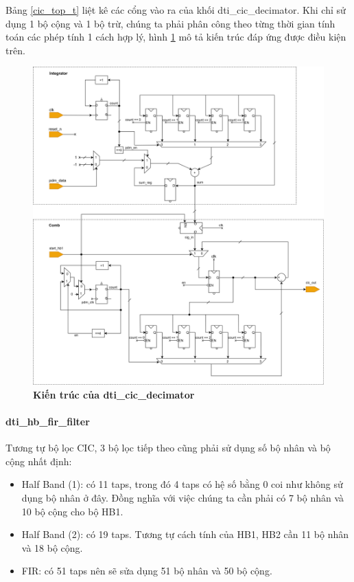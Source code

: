 Bảng \ref{cic_top_t} liệt kê các cổng vào ra của khối dti\_cic\_decimator. Khi chỉ sử dụng 1 bộ cộng và 1 bộ trừ, chúng ta phải phân công theo từng thời gian tính toán các phép tính 1 cách hợp lý, hình \ref{cic_top_arc} mô tả kiến trúc đáp ứng được điều kiện trên.

\begin{figure}[H]
    \centering
    \includegraphics[width=16cm]{Images/Chuong4/cic/cic_top_arc.png}
    \caption[Kiến trúc của dti\_cic\_decimator]{\bfseries \fontsize{12pt}{0pt}\selectfont Kiến trúc của dti\_cic\_decimator}
    \label{cic_top_arc}
\end{figure}
 \paragraph{dti\_hb\_fir\_filter}
Tương tự bộ lọc CIC, 3 bộ lọc tiếp theo cũng phải sử dụng số bộ nhân và bộ cộng nhất định:
\begin{itemize}
    \item Half Band (1): có 11 taps, trong đó 4 taps có hệ số bằng 0 coi như không sử dụng bộ nhân ở đây. Đồng nghĩa với việc chúng ta cần phải có 7 bộ nhân và 10 bộ cộng cho bộ HB1.
     \item Half Band (2): có 19 taps. Tương tự cách tính của HB1, HB2 cần 11 bộ nhân và 18 bộ cộng.
     \item FIR: có 51 taps nên sẽ sửa dụng 51 bộ nhân và 50 bộ cộng.
\end{itemize} 

